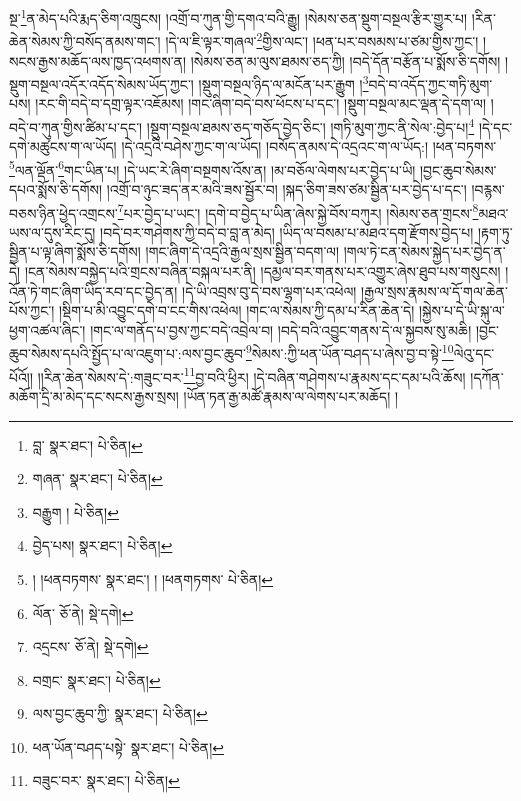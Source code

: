 སྔ་\footnote{བླ་  སྣར་ཐང་།  པེ་ཅིན། }ན་མེད་པའི་རྨད་ཅིག་འཁྲུངས། །འགྲོ་བ་ཀུན་གྱི་དགའ་བའི་རྒྱུ། །སེམས་ཅན་སྡུག་བསྔལ་རྩིར་གྱུར་པ། །རིན་ཆེན་སེམས་ཀྱི་བསོད་ནམས་གང་། །དེ་ལ་ཇི་ལྟར་གཞལ་\footnote{གཞན་  སྣར་ཐང་།  པེ་ཅིན། }གྱིས་ལང་། །ཕན་པར་བསམས་པ་ཙམ་གྱིས་ཀྱང་། །སངས་རྒྱས་མཆོད་ལས་ཁྱད་འཕགས་ན། །སེམས་ཅན་མ་ལུས་ཐམས་ཅད་ཀྱི། །བདེ་དོན་བརྩོན་པ་སྨོས་ཅི་དགོས། །སྡུག་བསྔལ་འདོར་འདོད་སེམས་ཡོད་ཀྱང་། །སྡུག་བསྔལ་ཉིད་ལ་མངོན་པར་རྒྱུག །\footnote{བརྒྱུག །  པེ་ཅིན། }བདེ་བ་འདོད་ཀྱང་གཏི་མུག་པས། །རང་གི་བདེ་བ་དགྲ་ལྟར་འཇོམས། །གང་ཞིག་བདེ་བས་ཕོངས་པ་དང་། །སྡུག་བསྔལ་མང་ལྡན་དེ་དག་ལ། །བདེ་བ་ཀུན་གྱིས་ཚིམ་པ་དང་། །སྡུག་བསྔལ་ཐམས་ཅད་གཅོད་བྱེད་ཅིང་། །གཏི་མུག་ཀྱང་ནི་སེལ་:བྱེད་པ།\footnote{བྱེད་པས།  སྣར་ཐང་།  པེ་ཅིན། } །དེ་དང་དགེ་མཚུངས་ག་ལ་ཡོད། །དེ་འདྲའི་བཤེས་ཀྱང་ག་ལ་ཡོད། །བསོད་ནམས་དེ་འདྲའང་ག་ལ་ཡོད:། །ཕན་བཏགས་\footnote{། །ཕནབཏགས་  སྣར་ཐང་། ། །ཕནགཏགས་  པེ་ཅིན། }ལན་ལྡོན་\footnote{ལོན་  ཅོ་ནེ།  སྡེ་དགེ། }གང་ཡིན་པ། །དེ་ཡང་རེ་ཞིག་བསྔགས་འོས་ན། །མ་བཅོལ་ལེགས་པར་བྱེད་པ་ཡི། །བྱང་ཆུབ་སེམས་དཔའ་སྨོས་ཅི་དགོས། །འགྲོ་བ་ཉུང་ཟད་ནར་མའི་ཟས་སྦྱོར་བ། །སྐད་ཅིག་ཟས་ཙམ་སྦྱིན་པར་བྱེད་པ་དང་། །བརྙས་བཅས་ཉིན་ཕྱེད་འགྲངས་\footnote{འདྲངས་  ཅོ་ནེ།  སྡེ་དགེ། }པར་བྱེད་པ་ཡང་། །དགེ་བ་བྱེད་པ་ཡིན་ཞེས་སྐྱེ་བོས་བཀུར། །སེམས་ཅན་གྲངས་\footnote{བགྲང་  སྣར་ཐང་།  པེ་ཅིན། }མཐའ་ཡས་ལ་དུས་རིང་དུ། །བདེ་བར་གཤེགས་ཀྱི་བདེ་བ་བླ་ན་མེད། །ཡིད་ལ་བསམ་པ་མཐའ་དག་རྫོགས་བྱེད་པ། །རྟག་ཏུ་སྦྱིན་པ་ལྟ་ཞིག་སྨོས་ཅི་དགོས། །གང་ཞིག་དེ་འདྲའི་རྒྱལ་སྲས་སྦྱིན་བདག་ལ། །གལ་ཏེ་ངན་སེམས་སྐྱེད་པར་བྱེད་ན་དེ། །ངན་སེམས་བསྐྱེད་པའི་གྲངས་བཞིན་བསྐལ་པར་ནི། །དམྱལ་བར་གནས་པར་འགྱུར་ཞེས་ཐུབ་པས་གསུངས། །འོན་ཏེ་གང་ཞིག་ཡིད་རབ་དང་བྱེད་ན། །དེ་ཡི་འབྲས་བུ་དེ་བས་ལྷག་པར་འཕེལ། །རྒྱལ་སྲས་རྣམས་ལ་དོ་གལ་ཆེན་པོས་ཀྱང་། །སྡིག་པ་མི་འབྱུང་དགེ་བ་ངང་གིས་འཕེལ། །གང་ལ་སེམས་ཀྱི་དམ་པ་རིན་ཆེན་དེ། །སྐྱེས་པ་དེ་ཡི་སྐུ་ལ་ཕྱག་འཚལ་ཞིང་། །གང་ལ་གནོད་པ་བྱས་ཀྱང་བདེ་འབྲེལ་བ། །བདེ་བའི་འབྱུང་གནས་དེ་ལ་སྐྱབས་སུ་མཆི། །བྱང་ཆུབ་སེམས་དཔའི་སྤྱོད་པ་ལ་འཇུག་པ་:ལས་བྱང་ཆུབ་\footnote{ལས་བྱང་ཆུབ་ཀྱི་  སྣར་ཐང་།  པེ་ཅིན། }སེམས་:ཀྱི་ཕན་ཡོན་བཤད་པ་ཞེས་བྱ་བ་སྟེ་\footnote{ཕན་ཡོན་བཤད་པསྟེ་  སྣར་ཐང་།  པེ་ཅིན། }ལེའུ་དང་པོའོ།། །།རིན་ཆེན་སེམས་དེ་:གཟུང་བར་\footnote{བཟུང་བར་  སྣར་ཐང་།  པེ་ཅིན། }བྱ་བའི་ཕྱིར། །དེ་བཞིན་གཤེགས་པ་རྣམས་དང་དམ་པའི་ཆོས། །དཀོན་མཆོག་དྲི་མ་མེད་དང་སངས་རྒྱས་སྲས། །ཡོན་ཏན་རྒྱ་མཚོ་རྣམས་ལ་ལེགས་པར་མཆོད། །
